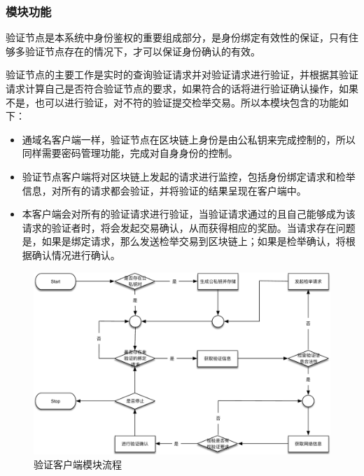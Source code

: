 \subsubsection{模块功能}

验证节点是本系统中身份鉴权的重要组成部分，是身份绑定有效性的保证，只有住够多验证节点存在的情况下，才可以保证身份确认的有效。

验证节点的主要工作是实时的查询验证请求并对验证请求进行验证，并根据其验证请求计算自己是否符合验证节点的要求，如果符合的话将进行验证确认操作，如果不是，也可以进行验证，对不符的验证提交检举交易。所以本模块包含的功能如下：

\begin{itemize}
	\item 
	\noindent{}

	通域名客户端一样，验证节点在区块链上身份是由公私钥来完成控制的，所以同样需要密码管理功能，完成对自身身份的控制。

	\item 
	\noindent{}
	验证节点客户端将对区块链上发起的请求进行监控，包括身份绑定请求和检举信息，对所有的请求都会验证，并将验证的结果呈现在客户端中。

	\item
	\noindent{}

	本客户端会对所有的验证请求进行验证，当验证请求通过的且自己能够成为该请求的验证者时，将会发起交易确认，从而获得相应的奖励。当请求存在问题是，如果是绑定请求，那么发送检举交易到区块链上；如果是检举确认，将根据确认情况进行确认。
	

\end{itemize}

\begin{figure}[!htbp]
 	\centering
 	\includegraphics[scale=0.6]{img/validator_work_flow}
 	\caption{验证客户端模块流程}\label{fig:validator_work_flow}
\end{figure}

